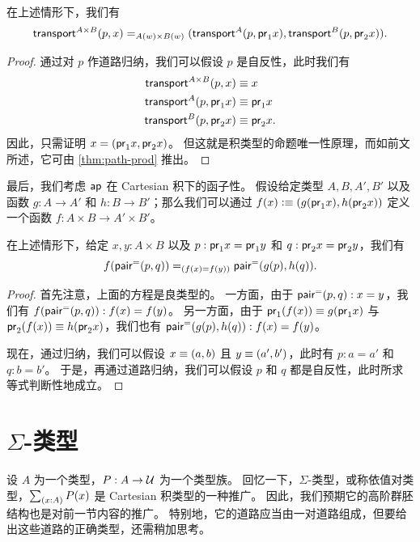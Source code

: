 \begin{thm}\label{thm:trans-prod}
  在上述情形下，我们有
  \[
  \id[A(w) \times B(w)]
  {\transfib{A\times B}px}
  {(\transfib{A}{p}{\proj{1}x}, \transfib{B}{p}{\proj{2}x})}.
  \]
\end{thm}

\begin{proof}
  通过对 $p$ 作道路归纳，我们可以假设 $p$ 是自反性，此时我们有
  \begin{align*}
    \transfib{A\times B}px&\jdeq x\\
    \transfib{A}{p}{\proj{1}x}&\jdeq \proj1x\\
    \transfib{B}{p}{\proj{2}x}&\jdeq \proj2x.
  \end{align*}
  因此，只需证明 $x = (\proj1 x, \proj2x)$。
  但这就是积类型的命题唯一性原理，而如前文所述，它可由 \cref{thm:path-prod} 推出。
\end{proof}

最后，我们考虑 $\apfunc{}$ 在 Cartesian 积下的函子性。
假设给定类型 $A,B,A',B'$ 以及函数 $g:A\to A'$ 和 $h:B\to B'$；那么我们可以通过 $f(x) \defeq (g(\proj1x),h(\proj2x))$ 定义一个函数 $f:A\times B\to A'\times B'$。

\begin{thm}\label{thm:ap-prod}
  在上述情形下，给定 $x,y:A\times B$ 以及 $p:\proj1x=\proj1y$ 和 $q:\proj2x=\proj2y$，我们有
  \[ \id[(f(x)=f(y))]{\ap{f}{\pairpath(p,q)}} {\pairpath(\ap{g}{p},\ap{h}{q})}. \]
\end{thm}

\begin{proof}
  首先注意，上面的方程是良类型的。
  一方面，由于 $\pairpath(p,q):x=y$，我们有 $\ap{f}{\pairpath(p,q)}:f(x)=f(y)$。
  另一方面，由于 $\proj1(f(x))\jdeq g(\proj1x)$ 与 $\proj2(f(x))\jdeq h(\proj2x)$，我们也有 $\pairpath(\ap{g}{p},\ap{h}{q}):f(x)=f(y)$。

  现在，通过归纳，我们可以假设 $x\jdeq(a,b)$ 且 $y\jdeq(a',b')$，此时有 $p:a=a'$ 和 $q:b=b'$。
  于是，再通过道路归纳，我们可以假设 $p$ 和 $q$ 都是自反性，此时所求等式判断性地成立。
\end{proof}

%

\section{\texorpdfstring{$\Sigma$}{Σ}-类型}
\label{sec:compute-sigma}

%
设 $A$ 为一个类型，$P:A\to\type$ 为一个类型族。
回忆一下，$\Sigma$-类型，或称依值对类型，$\sm{x:A} P(x)$ 是 Cartesian 积类型的一种推广。
因此，我们预期它的高阶群胚结构也是对前一节内容的推广。
特别地，它的道路应当由一对道路组成，但要给出这些道路的正确类型，还需稍加思考。

